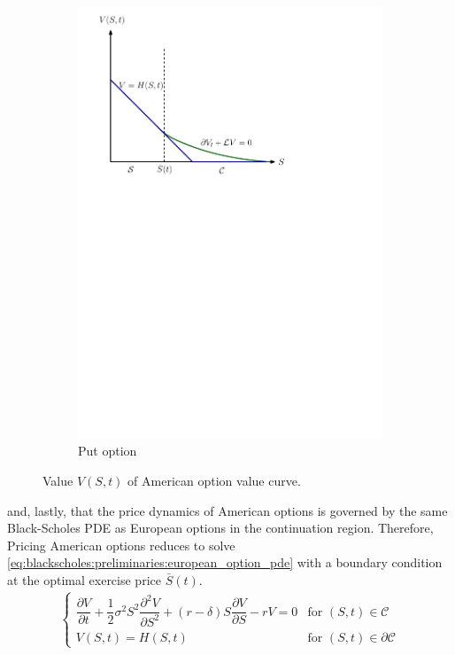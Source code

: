 \begin{figure}[H]
\begin{subfigure}{0.4\textwidth}
    \includegraphics[width=\textwidth]{chapters/chapter2/AmericanPutOptionValue.pdf}
    \caption{Put option}
    \label{fig:blackscholes:preliminaries:american_put_value_vs_curve}
  \end{subfigure}
  \caption{Value $V(S, t)$ of American option value curve. }
  \label{fig:blackscholes:preliminaries:american_option_value_vs_curve}
\end{figure}
and, lastly, that the price dynamics of
American options is governed by the same Black-Scholes PDE as European options in the continuation region. Therefore, Pricing American options reduces to solve \eqref{eq:blackscholes:preliminaries:european_option_pde} with a boundary condition at the optimal exercise price $\bar{S}(t)$.
\begin{align}
  \begin{cases}
    \dfrac{\partial{V}}{\partial{t}} + \dfrac{1}{2}\sigma^{2} S^2 \dfrac{\partial^2{V}}{\partial{S^2}} + (r - \delta)S \dfrac{\partial{V}}{\partial{S}} - rV = 0 & \text{for $(S, t) \in \mathcal{C}$} \\ V(S, t) = H(S, t) &
    \text{for $(S,t)\in \partial\mathcal{C}$}
  \end{cases}
  \label{eq:blackscholes:preliminaries:american_options_pde_free_boundary_problem}
\end{align}
